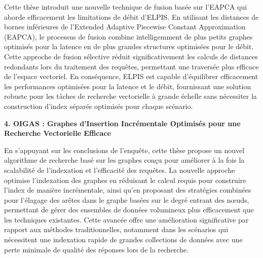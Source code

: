 Cette thèse introduit une nouvelle technique de fusion basée sur l'EAPCA qui aborde efficacement les limitations de débit d'ELPIS. En utilisant les distances de bornes inférieures de l'Extended Adaptive Piecewise Constant Approximation (EAPCA), le processus de fusion combine intelligemment de plus petits graphes optimisés pour la latence en de plus grandes structures optimisées pour le débit. Cette approche de fusion sélective réduit significativement les calculs de distances redondants lors du traitement des requêtes, permettant une traversée plus efficace de l'espace vectoriel. En conséquence, ELPIS est capable d'équilibrer efficacement les performances optimisées pour la latence et le débit, fournissant une solution robuste pour les tâches de recherche vectorielle à grande échelle sans nécessiter la construction d'index séparés optimisés pour chaque scénario.

\textbf{4. OIGAS : Graphes d'Insertion Incrémentale Optimisés pour une Recherche Vectorielle Efficace}

En s'appuyant sur les conclusions de l'enquête, cette thèse propose un nouvel algorithme de recherche basé sur les graphes conçu pour améliorer à la fois la scalabilité de l'indexation et l'efficacité des requêtes. La nouvelle approche optimise l'indexation des graphes en réduisant le calcul requis pour construire l'index de manière incrémentale, ainsi qu'en proposant des stratégies combinées pour l'élagage des arêtes dans le graphe basées sur le degré entrant des nœuds, permettant de gérer des ensembles de données volumineux plus efficacement que les techniques existantes. Cette avancée offre une amélioration significative par rapport aux méthodes traditionnelles, notamment dans les scénarios qui nécessitent une indexation rapide de grandes collections de données avec une perte minimale de qualité des réponses lors de la recherche.




